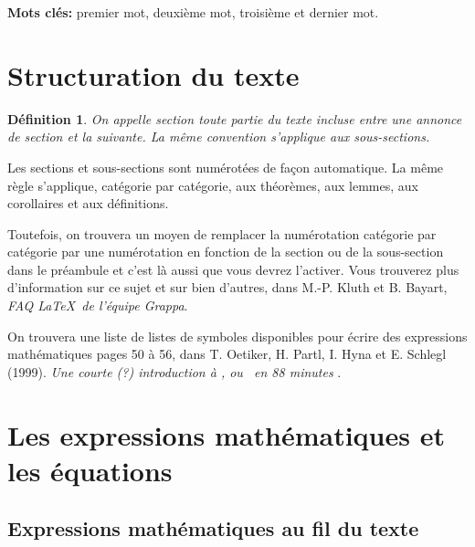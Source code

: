 \documentclass[10pt]{article}
\newtheorem{definition}{Définition}
\begin{document}
\textbf{Mots clés: } premier mot, deuxième mot, troisième et dernier mot.

\bigskip

\hypertarget{structuration-du-texte}{%
\section{\texorpdfstring{Structuration du texte
\label{sec1}}{Structuration du texte }}\label{structuration-du-texte}}

\begin{definition}
On appelle section toute partie du texte incluse entre une annonce de section et la suivante. La même convention s'applique aux sous-sections.
\end{definition}

Les sections et sous-sections sont numérotées de façon automatique. La
même règle s'applique, catégorie par catégorie, aux théorèmes, aux
lemmes, aux corollaires et aux définitions.

Toutefois, on trouvera un moyen de remplacer la numérotation catégorie
par catégorie par une numérotation en fonction de la section ou de la
sous-section dans le préambule et c'est là aussi que vous devrez
l'activer. Vous trouverez plus d'information sur ce sujet et sur bien
d'autres, dans M.-P. Kluth et B. Bayart,
\emph{FAQ \LaTeX~de l'équipe Grappa}\cite{faq}.

On trouvera une liste de listes de symboles disponibles pour écrire des
expressions mathématiques pages 50 à 56, dans T. Oetiker, H. Partl, I.
Hyna et E. Schlegl (1999).
\emph{Une courte (?) introduction à \LaTeXe, ou  \LaTeXe~en 88 minutes}
\cite{oeti}.

\hypertarget{les-expressions-mathuxe9matiques-et-les-uxe9quations}{%
\section{\texorpdfstring{Les expressions mathématiques et les équations
\label{sec2}}{Les expressions mathématiques et les équations }}\label{les-expressions-mathuxe9matiques-et-les-uxe9quations}}

\hypertarget{expressions-mathuxe9matiques-au-fil-du-texte}{%
\subsection{\texorpdfstring{Expressions mathématiques au fil du texte
\label{fil}}{Expressions mathématiques au fil du texte }}\label{expressions-mathuxe9matiques-au-fil-du-texte}}
\end{document}
